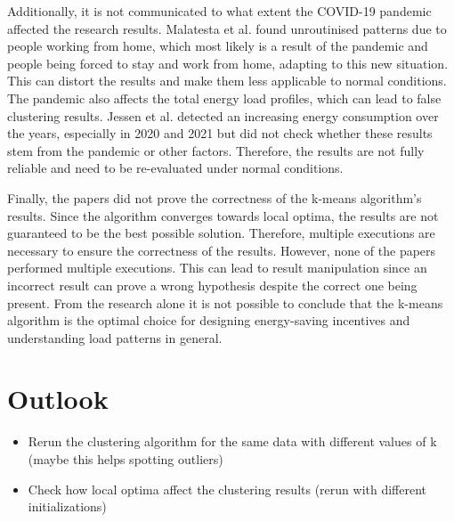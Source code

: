 Additionally, it is not communicated to what extent the COVID-19 pandemic affected the research results.
Malatesta et al. \cite{MAL-HBP} found unroutinised patterns due to people working from home, which most likely is a result of the pandemic and people being forced to stay and work from home, adapting to this new situation.
This can distort the results and make them less applicable to normal conditions.
The pandemic also affects the total energy load profiles, which can lead to false clustering results.
Jessen et al. \cite{JES-IND} detected an increasing energy consumption over the years, especially in 2020 and 2021 but did not check whether these results stem from the pandemic or other factors.
Therefore, the results are not fully reliable and need to be re-evaluated under normal conditions.

Finally, the papers did not prove the correctness of the k-means algorithm's results.
Since the algorithm converges towards local optima, the results are not guaranteed to be the best possible solution.
Therefore, multiple executions are necessary to ensure the correctness of the results.
However, none of the papers performed multiple executions.
This can lead to result manipulation since an incorrect result can prove a wrong hypothesis despite the correct one being present.
From the research alone it is not possible to conclude that the k-means algorithm is the optimal choice for designing energy-saving incentives and understanding load patterns in general.


\section{Outlook}
\begin{itemize}
    \item Rerun the clustering algorithm for the same data with different values of k (maybe this helps spotting outliers)
    \item Check how local optima affect the clustering results (rerun with different initializations)
\end{itemize}
